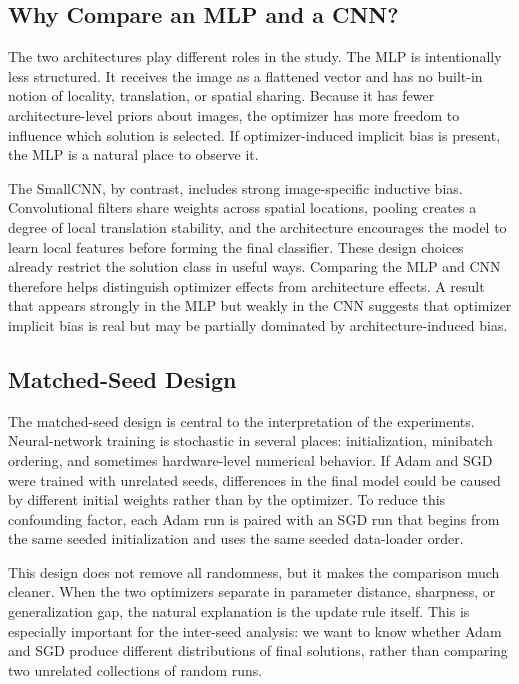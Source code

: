 \documentclass[11pt]{article}
\begin{document}
\subsection{Why Compare an MLP and a CNN?}

The two architectures play different roles in the study. The MLP is intentionally less structured. It receives the image as a flattened vector and has no built-in notion of locality, translation, or spatial sharing. Because it has fewer architecture-level priors about images, the optimizer has more freedom to influence which solution is selected. If optimizer-induced implicit bias is present, the MLP is a natural place to observe it.

The SmallCNN, by contrast, includes strong image-specific inductive bias. Convolutional filters share weights across spatial locations, pooling creates a degree of local translation stability, and the architecture encourages the model to learn local features before forming the final classifier. These design choices already restrict the solution class in useful ways. Comparing the MLP and CNN therefore helps distinguish optimizer effects from architecture effects. A result that appears strongly in the MLP but weakly in the CNN suggests that optimizer implicit bias is real but may be partially dominated by architecture-induced bias.

\subsection{Matched-Seed Design}

The matched-seed design is central to the interpretation of the experiments. Neural-network training is stochastic in several places: initialization, minibatch ordering, and sometimes hardware-level numerical behavior. If Adam and SGD were trained with unrelated seeds, differences in the final model could be caused by different initial weights rather than by the optimizer. To reduce this confounding factor, each Adam run is paired with an SGD run that begins from the same seeded initialization and uses the same seeded data-loader order.

This design does not remove all randomness, but it makes the comparison much cleaner. When the two optimizers separate in parameter distance, sharpness, or generalization gap, the natural explanation is the update rule itself. This is especially important for the inter-seed analysis: we want to know whether Adam and SGD produce different distributions of final solutions, rather than comparing two unrelated collections of random runs.
\end{document}
